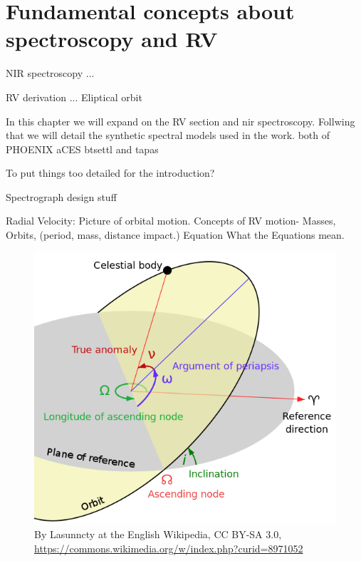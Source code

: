 
\chapter{Fundamental concepts about spectroscopy and RV}
\label{cha:concepts}

NIR spectroscopy ...


RV derivation ...
Eliptical orbit

In this chapter we will expand  on the RV section and nir spectroscopy. Follwing that we will  detail the synthetic spectral models used in the work. both of PHOENIX aCES btsettl and tapas 


To put things too detailed for the introduction?


Spectrograph design stuff


Radial Velocity:
Picture of orbital motion.
Concepts of {RV} motion-
Masses,
Orbits, (period, mass, distance impact.)
Equation
What the Equations mean.
\begin{figure}
    \centering
    \includegraphics[width=0.7\linewidth]{figures/advanced_material/orbit}
    \caption{By Lasunncty at the English Wikipedia, CC BY-SA 3.0, \href{https://commons.wikimedia.org/w/index.php?curid=8971052}{https://commons.wikimedia.org/w/index.php?curid=8971052}}
    \label{fig:orbit}
\end{figure}

{ }

